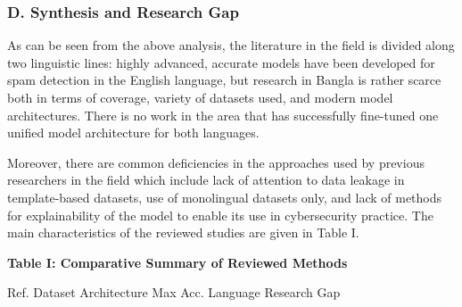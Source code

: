 \subsubsection{D. Synthesis and Research
Gap}\label{d.-synthesis-and-research-gap}

As can be seen from the above analysis, the literature in the field is
divided along two linguistic lines: highly advanced, accurate models
have been developed for spam detection in the English language, but
research in Bangla is rather scarce both in terms of coverage, variety
of datasets used, and modern model architectures. There is no work in
the area that has successfully fine-tuned one unified model architecture
for both languages.

Moreover, there are common deficiencies in the approaches used by
previous researchers in the field which include lack of attention to
data leakage in template-based datasets, use of monolingual datasets
only, and lack of methods for explainability of the model to enable its
use in cybersecurity practice. The main characteristics of the reviewed
studies are given in Table I.

\textbf{Table I: Comparative Summary of Reviewed Methods}

Ref. \textbar{} Dataset \textbar{} Architecture \textbar{} Max Acc.
\textbar{} Language \textbar{} Research Gap \textbar{}

